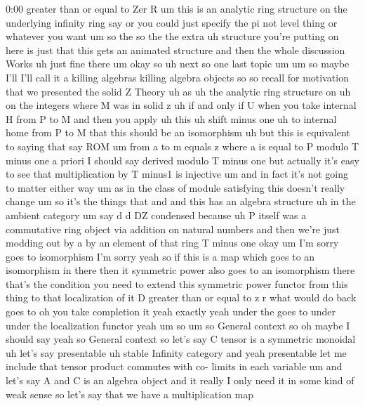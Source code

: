 \begin{unfinished}{0:00}
greater  than  or  equal  to  Zer
R  um  this  is  an  analytic  ring
structure  on  the  underlying  infinity
ring
say  or  you  could  just  specify  the  pi  not
level  thing  or  whatever  you
want  um  so  the  so  the  the  extra  uh
structure  you're  putting  on  here  is  just
that  this  gets  an  animated
structure  and  then  the  whole  discussion
Works  uh  just  fine
there
um
okay
so  uh  next  so  one  last
topic
um
um  so  maybe  I'll  I'll  call  it  a  killing
algebras  killing  algebra
objects  so  so  recall  for
motivation  that  we  presented  the  solid  Z
Theory
uh  as  uh  the  analytic  ring  structure  on
uh  on  the  integers  where  M  was  in  solid
z  uh  if  and  only  if  U  when  you  take
internal  H  from  P  to  M  and  then  you
apply  uh  this  uh  shift  minus  one  uh  to
internal  home  from  P  to  M  that  this
should  be  an
isomorphism
uh
but  this  is  equivalent  to  saying  that
say  ROM  um  from  a  to  m  equals  z
where  a  is  equal  to  P  modulo  T  minus  one
a  priori  I  should  say  derived  modulo  T
minus  one  but  actually  it's  easy  to  see
that  multiplication  by  T  minus1  is
injective
um  and  in  fact  it's  not  going  to  matter
either  way  um  as  in  the  class  of  module
satisfying  this  doesn't  really  change
um  so  it's  the  things  that  and  and  this
has  an  algebra
structure
uh  in  the  ambient  category  um  say  d  d
DZ
condensed  because  uh  P  itself  was  a
commutative  ring  object  via  addition  on
natural  numbers  and  then  we're  just
modding  out  by  a  by  an  element  of  that
ring  T  minus
one  okay
um  I'm  sorry  goes  to
isomorphism  I'm  sorry
yeah  so  if  this  is  a  map  which  goes  to
an  isomorphism  in  there  then  it
symmetric  power  also  goes  to  an
isomorphism  there  that's  the  condition
you  need  to  extend  this  symmetric  power
functor  from  this  thing  to  that
localization  of  it  D  greater  than  or
equal  to  z
r  what  would  do  back  goes  to  oh  you  take
completion  it  yeah  exactly  yeah  under
the  goes  to  under  under  the  localization
functor
yeah
um
so
um  so  General
context  so  oh  maybe  I  should  say  yeah  so
General
context  so  let's  say  C  tensor  is  a
symmetric
monoidal  uh  let's  say
presentable  uh  stable  Infinity
category  and  yeah  presentable  let  me
include  that  tensor  product  commutes
with  co-  limits  in  each
variable  um  and  let's  say  A  and  C  is  an
algebra
object  and  it  really  I  only  need  it  in
some  kind  of  weak  sense  so  let's  say
that  we  have  a  multiplication  map

\end{unfinished}
